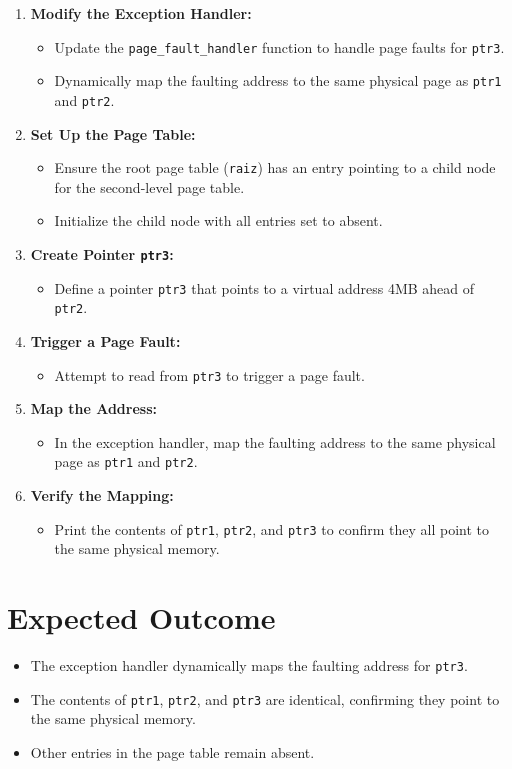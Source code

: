 \documentclass[a4paper,12pt]{report}
\begin{document}
\begin{enumerate}
    \item \textbf{Modify the Exception Handler:}
    \begin{itemize}
        \item Update the \texttt{page\_fault\_handler} function to handle page faults for \texttt{ptr3}.
        \item Dynamically map the faulting address to the same physical page as \texttt{ptr1} and \texttt{ptr2}.
    \end{itemize}
    \item \textbf{Set Up the Page Table:}
    \begin{itemize}
        \item Ensure the root page table (\texttt{raiz}) has an entry pointing to a child node for the second-level page table.
        \item Initialize the child node with all entries set to absent.
    \end{itemize}
    \item \textbf{Create Pointer \texttt{ptr3}:}
    \begin{itemize}
        \item Define a pointer \texttt{ptr3} that points to a virtual address 4MB ahead of \texttt{ptr2}.
    \end{itemize}
    \item \textbf{Trigger a Page Fault:}
    \begin{itemize}
        \item Attempt to read from \texttt{ptr3} to trigger a page fault.
    \end{itemize}
    \item \textbf{Map the Address:}
    \begin{itemize}
        \item In the exception handler, map the faulting address to the same physical page as \texttt{ptr1} and \texttt{ptr2}.
    \end{itemize}
    \item \textbf{Verify the Mapping:}
    \begin{itemize}
        \item Print the contents of \texttt{ptr1}, \texttt{ptr2}, and \texttt{ptr3} to confirm they all point to the same physical memory.
    \end{itemize}
\end{enumerate}

\section{Expected Outcome}
\begin{itemize}
    \item The exception handler dynamically maps the faulting address for \texttt{ptr3}.
    \item The contents of \texttt{ptr1}, \texttt{ptr2}, and \texttt{ptr3} are identical, confirming they point to the same physical memory.
    \item Other entries in the page table remain absent.
\end{itemize}
\end{document}
